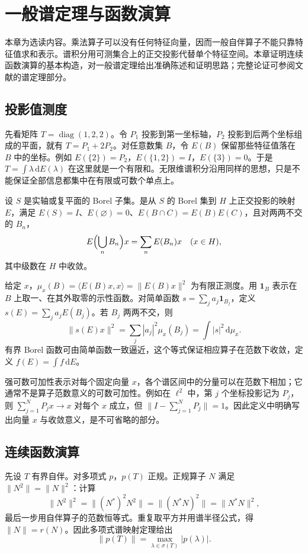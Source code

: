\documentclass[UTF8,12pt,a4paper,fontset=fandol]{ctexbook}
\begin{document}
\chapter{一般谱定理与函数演算}
\label{chap:fa-general-spectral}

本章为选读内容。乘法算子可以没有任何特征向量，因而一般自伴算子不能只靠特征值求和表示。谱积分用可测集合上的正交投影代替单个特征空间。本章证明连续函数演算的基本构造，对一般谱定理给出准确陈述和证明思路；完整论证可参阅文献\cite{teschl}的谱定理部分。

\section{投影值测度}
先看矩阵 $T=\operatorname{diag}(1,2,2)$。令 $P_1$ 投影到第一坐标轴，$P_2$ 投影到后两个坐标组成的平面，就有 $T=P_1+2P_2$。对任意数集 $B$，令 $E(B)$ 保留那些特征值落在 $B$ 中的坐标。例如 $E(\{2\})=P_2$，$E(\{1,2\})=I$，$E(\{3\})=0$。于是 $T=\int\lambda\,\mathrm dE(\lambda)$ 在这里就是一个有限和。无限维谱积分沿用同样的思想，只是不能保证全部信息都集中在有限或可数个单点上。

\begin{definition}
设 $S$ 是实轴或复平面的 Borel 子集。是从 $S$ 的 Borel 集到 $H$ 上正交投影的映射 $E$，满足 $E(S)=I$、$E(\varnothing)=0$、$E(B\cap C)=E(B)E(C)$，且对两两不交的 $B_n$，
\[
 E\Bigl(\bigcup_nB_n\Bigr)x=\sum_nE(B_n)x\quad(x\in H),
\]
其中级数在 $H$ 中收敛。
\end{definition}
给定 $x$，$\mu_x(B)=\langle E(B)x,x\rangle=\|E(B)x\|^2$ 为有限正测度。用 $\mathbf1_B$ 表示在 $B$ 上取一、在其外取零的示性函数。对简单函数 $s=\sum_ja_j\mathbf1_{B_j}$，定义 $s(E)=\sum_ja_jE(B_j)$。若 $B_j$ 两两不交，则
\[
 \|s(E)x\|^2=\sum_j|a_j|^2\mu_x(B_j)=\int|s|^2\,\mathrm d\mu_x.
\]
有界 Borel 函数可由简单函数一致逼近，这个等式保证相应算子在范数下收敛，定义 $f(E)=\int f\,\mathrm dE$。

强可数可加性表示对每个固定向量 $x$，各个谱区间中的分量可以在范数下相加；它通常不是算子范数意义的可数可加性。例如在 $\ell^2$ 中，第 $j$ 个坐标投影记为 $P_j$，则 $\sum_{j=1}^NP_jx\to x$ 对每个 $x$ 成立，但 $\|I-\sum_{j=1}^NP_j\|=1$。因此定义中明确写出向量 $x$ 与收敛意义，是不可省略的部分。

\section{连续函数演算}
先设 $T$ 有界自伴。对多项式 $p$，$p(T)$ 正规。正规算子 $N$ 满足 $\|N^2\|=\|N\|^2$：计算
\[
 \|N^2\|^2=\|(N^*)^2N^2\|=\|(N^*N)^2\|=\|N^*N\|^2,
\]
最后一步用自伴算子的范数恒等式。重复取平方并用谱半径公式，得 $\|N\|=r(N)$。因此多项式谱映射定理给出
\[
 \|p(T)\|=\max_{\lambda\in\sigma(T)}|p(\lambda)|.
\]
\end{document}
